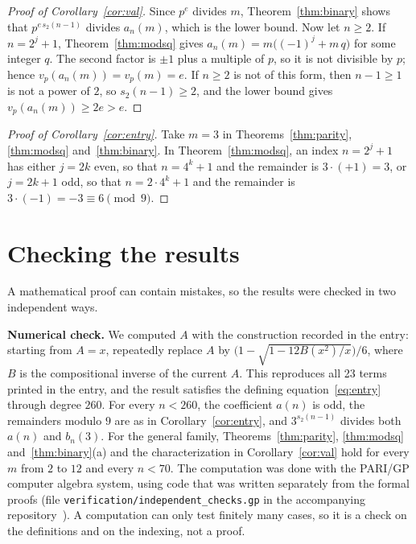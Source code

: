 \documentclass[11pt,a4paper]{article}
\theoremstyle{definition}
\theoremstyle{remark}
\newcommand{\para}[1]{\par\medskip\noindent\textbf{#1}\enspace}
\begin{document}
\begin{proof}[Proof of Corollary~\ref{cor:val}]
Since $p^{e}$ divides $m$, Theorem~\ref{thm:binary} shows that $p^{e\,s_2(n-1)}$ divides $a_n(m)$, which is the lower
bound. Now let $n\ge2$. If $n=2^j+1$, Theorem~\ref{thm:modsq} gives $a_n(m)=m\bigl((-1)^j+m\,q\bigr)$ for some integer
$q$. The second factor is $\pm1$ plus a multiple of $p$, so it is not divisible by $p$; hence $v_p(a_n(m))=v_p(m)=e$.
If $n\ge2$ is not of this form, then $n-1\ge1$ is not a power of $2$, so $s_2(n-1)\ge2$, and the lower bound gives
$v_p(a_n(m))\ge2e>e$.
\end{proof}

\begin{proof}[Proof of Corollary~\ref{cor:entry}]
Take $m=3$ in Theorems~\ref{thm:parity}, \ref{thm:modsq} and~\ref{thm:binary}. In Theorem~\ref{thm:modsq}, an index
$n=2^j+1$ has either $j=2k$ even, so that $n=4^k+1$ and the remainder is $3\cdot(+1)=3$, or $j=2k+1$ odd, so that
$n=2\cdot4^k+1$ and the remainder is $3\cdot(-1)=-3\equiv6\pmod9$.
\end{proof}

\section{Checking the results}\label{sec:checks}

A mathematical proof can contain mistakes, so the results were checked in two independent ways.

\para{Numerical check.}
We computed $A$ with the construction recorded in the entry: starting from $A=x$, repeatedly replace $A$
by $\bigl(1-\sqrt{1-12B(x^2)/x}\bigr)/6$, where $B$ is the compositional inverse of the current $A$. This reproduces all
23 terms printed in the entry, and the result satisfies the defining equation~\eqref{eq:entry} through degree $260$.
For every $n<260$, the coefficient $a(n)$ is odd, the remainders modulo $9$ are as in Corollary~\ref{cor:entry}, and
$3^{s_2(n-1)}$ divides both $a(n)$ and $b_n(3)$. For the general family, Theorems~\ref{thm:parity}, \ref{thm:modsq}
and~\ref{thm:binary}(a) and the characterization in Corollary~\ref{cor:val} hold for every $m$ from $2$ to $12$ and
every $n<70$.
The computation was done with the PARI/GP computer algebra system, using code that was written separately from the
formal proofs (file \texttt{verification/independent\_checks.gp} in the accompanying repository~\cite{repo}).
A computation can only test finitely many cases, so it is a check on the definitions and on the indexing, not a proof.
\end{document}
